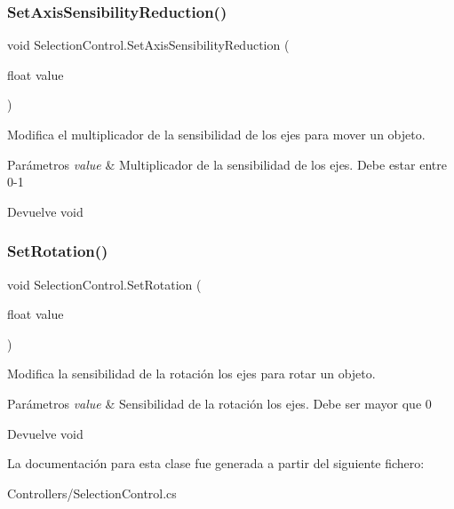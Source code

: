 \subsubsection{\texorpdfstring{SetAxisSensibilityReduction()}{SetAxisSensibilityReduction()}}
{\footnotesize\ttfamily void Selection\+Control.\+Set\+Axis\+Sensibility\+Reduction (\begin{DoxyParamCaption}\item[{float}]{value }\end{DoxyParamCaption})\hspace{0.3cm}{\ttfamily [inline]}}

Modifica el multiplicador de la sensibilidad de los ejes para mover un objeto. 
\begin{DoxyParams}{Parámetros}
{\em value} & Multiplicador de la sensibilidad de los ejes. Debe estar entre 0-\/1 \\
\hline
\end{DoxyParams}
\begin{DoxyReturn}{Devuelve}
void 
\end{DoxyReturn}
\mbox{\label{class_selection_control_ae30e28c63db233cb7a7b9d71174c2846}} 
\subsubsection{\texorpdfstring{SetRotation()}{SetRotation()}}
{\footnotesize\ttfamily void Selection\+Control.\+Set\+Rotation (\begin{DoxyParamCaption}\item[{float}]{value }\end{DoxyParamCaption})\hspace{0.3cm}{\ttfamily [inline]}}

Modifica la sensibilidad de la rotación los ejes para rotar un objeto. 
\begin{DoxyParams}{Parámetros}
{\em value} & Sensibilidad de la rotación los ejes. Debe ser mayor que 0 \\
\hline
\end{DoxyParams}
\begin{DoxyReturn}{Devuelve}
void 
\end{DoxyReturn}


La documentación para esta clase fue generada a partir del siguiente fichero\+:\begin{DoxyCompactItemize}
\item 
Controllers/Selection\+Control.\+cs\end{DoxyCompactItemize}
